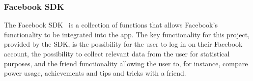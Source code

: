 \subsubsection{Facebook SDK}
The Facebook SDK~\cite{fsdk} is a collection of functions that allows Facebook's functionality to be integrated into the app. The key functionality for this project, 
provided by the SDK, is the possibility for the user to log in on their Facebook account, the possibility to collect relevant data from the user for statistical purposes, and the 
friend functionality allowing the user to, for instance, compare power usage, achievements and tips and tricks with a friend. 

